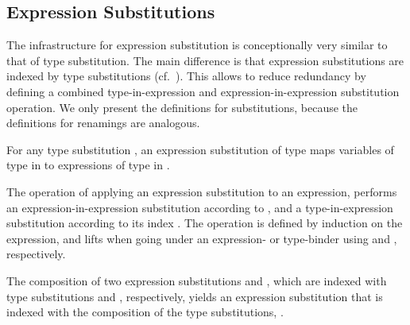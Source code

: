 \documentclass[acmsmall,anonymous,review,screen]{acmart}
\begin{document}
\subsection{Expression Substitutions}
\label{sec:substitutions:expr}

The infrastructure for expression substitution is conceptionally very similar to
that of type substitution.
The main difference is that expression substitutions are indexed by
type substitutions (cf.~\cite{DBLP:conf/mpc/ChapmanKNW19}).
This allows to reduce redundancy by defining a combined type-in-expression and
expression-in-expression substitution operation.
We only present the definitions for substitutions, because
the definitions for renamings are analogous.

For any type substitution , an expression substitution of
type  maps variables of type  in
 to expressions of type  in .
\SubDefESub

The operation {\AEsub} of applying an expression substitution  to an expression,
performs an expression-in-expression substitution according to ,
and a type-in-expression substitution according to its index .
The operation is defined by induction on the expression, and lifts  when
going under an expression- or type-binder using {\AEliftS} and
{\AEliftSL}, respectively.
\SubDefEsub




The composition of two expression substitutions  and , which
are indexed with type substitutions  and
, respectively, yields an expression substitution that
is indexed with the composition of the type substitutions,
.
\SubstExamplesECompSS
\end{document}
